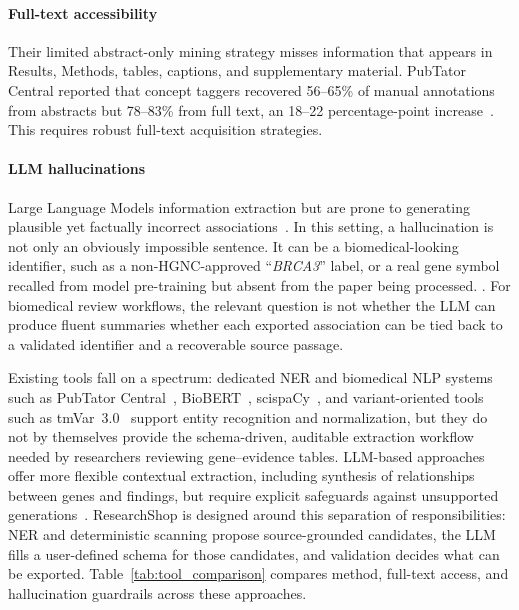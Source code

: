 \paragraph{Full-text accessibility} Their limited abstract-only mining strategy misses information that appears in Results, Methods, tables, captions, and supplementary material. PubTator Central reported that concept taggers recovered 56--65\% of manual annotations from abstracts but 78--83\% from full text, an 18--22 percentage-point increase~\cite{wei2019pubtatorcentral}. This requires robust full-text acquisition strategies.

\paragraph{LLM hallucinations} Large Language Models \DIFdelbegin {}\DIFdelend{} \DIFaddbegin {}\DIFaddend{} information extraction but are prone to generating plausible yet factually incorrect associations~\cite{farquhar2024semanticentropy}. In this setting, a hallucination is not only an obviously impossible sentence. It can be a biomedical-looking identifier, such as a non-HGNC-approved ``\textit{BRCA3}'' label, or a real gene symbol recalled from model pre-training but absent from the paper being processed. \DIFdelbegin {}\DIFdelend{} \DIFaddbegin {}\DIFaddend . For biomedical review workflows, \DIFdelbegin {}\DIFdelend the relevant question is not whether the LLM can produce fluent summaries\DIFdelbegin {}\DIFdelend{} \DIFaddbegin {}\DIFaddend{} whether each exported association can be tied back to a validated identifier and a recoverable source passage.

Existing tools fall on a spectrum: dedicated NER and biomedical NLP systems such as PubTator Central~\cite{wei2019pubtatorcentral}, BioBERT~\cite{lee2020biobert}, scispaCy~\cite{neumann2019scispacy}, and variant-oriented tools such as tmVar~3.0~\cite{wei2022tmvar3} support entity recognition and normalization, but they do not by themselves provide the schema-driven, auditable extraction workflow needed by researchers reviewing gene--evidence tables. LLM-based approaches offer more flexible contextual extraction, including synthesis of relationships between genes and findings, but require explicit safeguards against unsupported generations~\cite{ji2023hallucination,farquhar2024semanticentropy}. ResearchShop is designed around this separation of responsibilities: NER and deterministic scanning propose source-grounded candidates, the LLM fills a user-defined schema for those candidates, and validation decides what can be exported. Table~\ref{tab:tool_comparison} compares method, full-text access, and hallucination guardrails across these approaches.

